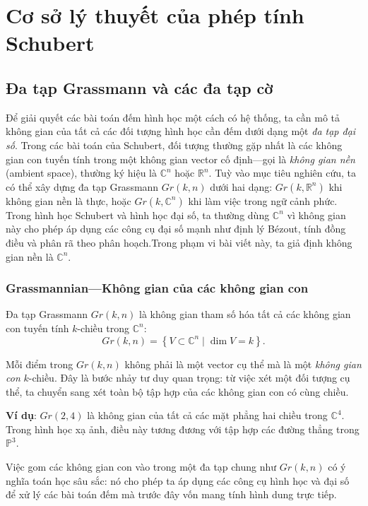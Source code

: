 \section{Cơ sở lý thuyết của phép tính Schubert}

\subsection{Đa tạp Grassmann và các đa tạp cờ}
Để giải quyết các bài toán đếm hình học một cách có hệ thống, ta cần mô tả không gian của tất cả các đối tượng hình học cần đếm dưới dạng một \textit{đa tạp đại số}. Trong các bài toán của Schubert, đối tượng thường gặp nhất là các không gian con tuyến tính trong một không gian vector cố định—gọi là \textit{không gian nền} (ambient space), thường ký hiệu là $\mathbb{C}^n$ hoặc $\mathbb{R}^n$. Tuỳ vào mục tiêu nghiên cứu, ta có thể xây dựng đa tạp Grassmann $Gr(k,n)$ dưới hai dạng: $Gr(k, \mathbb{R}^n)$ khi không gian nền là thực, hoặc $Gr(k, \mathbb{C}^n)$ khi làm việc trong ngữ cảnh phức. Trong hình học Schubert và hình học đại số, ta thường dùng $\mathbb{C}^n$ vì không gian này cho phép áp dụng các công cụ đại số mạnh như định lý Bézout, tính đồng điều và phân rã theo phân hoạch.Trong phạm vi bài viết này, ta giả định không gian nền là $\mathbb{C}^n$.

\subsubsection{\textbf{Grassmannian---Không gian của các không gian con}}

Đa tạp Grassmann $Gr(k,n)$ là không gian tham số hóa tất cả các không gian con tuyến tính $k$-chiều trong $\mathbb{C}^n$:
$$
Gr(k,n) = \left\{ V \subset \mathbb{C}^n \mid \dim V = k \right\}. 
$$

Mỗi điểm trong $Gr(k,n)$ không phải là một vector cụ thể mà là một \textit{không gian con} $k$-chiều. Đây là bước nhảy tư duy quan trọng: từ việc xét một đối tượng cụ thể, ta chuyển sang xét toàn bộ tập hợp của các không gian con có cùng chiều.

\textbf{Ví dụ}: $Gr(2,4)$ là không gian của tất cả các mặt phẳng hai chiều trong $\mathbb{C}^4$. Trong hình học xạ ảnh, điều này tương đương với tập hợp các đường thẳng trong $\mathbb{P}^3$.

Việc gom các không gian con vào trong một đa tạp chung như $Gr(k,n)$ có ý nghĩa toán học sâu sắc: nó cho phép ta áp dụng các công cụ hình học và đại số để xử lý các bài toán đếm mà trước đây vốn mang tính hình dung trực tiếp.

